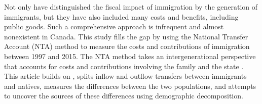 \vspace{0.7em}\par
Not only have \citet{Lee:1998fs} distinguished the fiscal impact of immigration by the generation of immigrants, but they have also included many costs and benefits, including public goods.
Such a comprehensive approach is infrequent and almost nonexistent in Canada.
This study fills the gap by using the National Transfer Account (NTA) method to measure the costs and contributions of immigration between 1997 and 2015.
The NTA method takes an intergenerational perspective that accounts for costs and contributions involving the family and the state \citep{Mason:2011wc,UnitedNations:2013vz}.
This article builds on \citet{merettePopulationAgingCanada2019}, splits inflow and outflow transfers between immigrants and natives, measures the differences between the two populations, and attempts to uncover the sources of these differences using demographic decomposition.

